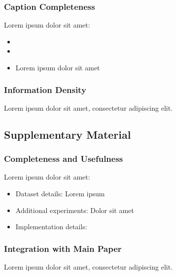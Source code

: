 \subsubsection{Caption Completeness}
Lorem ipsum dolor sit amet:
\begin{itemize}
    \item {}
    \item {}
    \item Lorem ipsum dolor sit amet
\end{itemize}

\subsubsection{Information Density}
Lorem ipsum dolor sit amet, consectetur adipiscing elit. 

\subsection{Supplementary Material}
\subsubsection{Completeness and Usefulness}
Lorem ipsum dolor sit amet:
\begin{itemize}
    \item Dataset details: Lorem ipsum
    \item Additional experiments: Dolor sit amet
    \item Implementation details: 
\end{itemize}

\subsubsection{Integration with Main Paper}
Lorem ipsum dolor sit amet, consectetur adipiscing elit. 